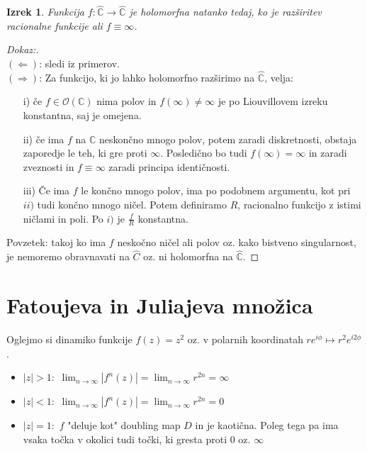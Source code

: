 \documentclass{article}
\newtheorem{izrek}{Izrek}
\newcommand{\C}{\mathbb{C}}
\newcommand{\Ho}{\mathcal{O}}
\begin{document}
\begin{izrek}
Funkcija $f: \hat{\C} \rightarrow \hat{\C}$ je holomorfna natanko tedaj, ko je razširitev racionalne funkcije ali $f \equiv \infty$.
\end{izrek}

\begin{proof}[Dokaz:]
~\\
$(\Longleftarrow)$: sledi iz primerov.\\ 
$(\Longrightarrow)$: 
Za funkcijo, ki jo lahko holomorfno razširimo na $\hat{\C}$, velja:
\begin{enumerate}
\item[i)] če $f\in \Ho(\C)$ nima polov in $f(\infty) \neq \infty$ je po Liouvillovem izreku konstantna, saj je omejena.
\item[ii)] če ima $f$ na $\C$ neskončno mnogo polov, potem zaradi diskretnosti, obstaja zaporedje le teh, ki gre proti $\infty$.
Posledično bo tudi $f(\infty) = \infty$ in zaradi zveznosti in $f \equiv \infty$ zaradi principa identičnosti.
\item[iii)] Če ima $f$ le končno mnogo polov, ima po podobnem argumentu, kot pri $ii)$ tudi končno mnogo ničel. Potem definiramo $R$, racionalno funkcijo z istimi ničlami in poli. 
Po $i)$ je $\frac{f}{R}$ konstantna.
\end{enumerate}
Povzetek: takoj ko ima $f$ neskočno ničel ali polov oz. kako bistveno singularnost, je nemoremo obravnavati na $\hat{C}$ oz. ni holomorfna na $\hat{\C}$.
\end{proof}

\section{Fatoujeva in Juliajeva množica}

Oglejmo si dinamiko funkcije $f(z) = z^2$ oz. v polarnih 
koordinatah $re^{i\phi} \mapsto r^2 e^{i2\phi}$.
\begin{itemize}
\item $|z| > 1:$ $\lim_{n\rightarrow \infty} |f^n(z)| = \lim_{n\rightarrow \infty} r^{2n} = \infty$
\item $|z| < 1:$ $\lim_{n\rightarrow \infty} |f^n(z)| = \lim_{n\rightarrow \infty} r^{2n} = 0$
\item $|z| = 1:$ $f$ "deluje kot" doubling map $D$ in je kaotična. Poleg tega pa ima vsaka točka v okolici tudi točki, ki gresta proti $0$ oz. $\infty$
\end{itemize}
\end{document}
